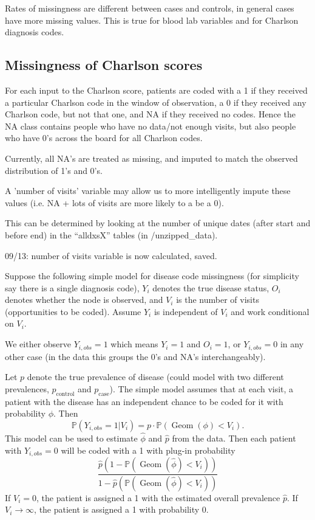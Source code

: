 \documentclass[12pt]{article}
\begin{document}
Rates of missingness are different between cases and controls, in general cases have more missing values. This is true for blood lab variables and for Charlson diagnosis codes.

\subsection*{Missingness of Charlson scores}

For each input to the Charlson score, patients are coded with a 1 if they received a particular Charlson code in the window of observation, a 0 if they received any Charlson code, but not that one, and NA if they received no codes. Hence the NA class contains people who have no data/not enough visits, but also people who have 0's across the board for all Charlson codes.

Currently, all NA's are treated as missing, and imputed to match the observed distribution of 1's and 0's.

A 'number of visits' variable may allow us to more intelligently impute these values (i.e. NA + lots of visits are more likely to a be a 0).

This can be determined by looking at the number of unique dates (after start and before end) in the ``alldxsX'' tables (in /unzipped\_data).

09/13: number of visits variable is now calculated, saved.

Suppose the following simple model for disease code missingness (for simplicity say there is a single diagnosis code), $Y_i$ denotes the true disease status, $O_i$ denotes whether the node is observed, and $V_i$ is the number of visits (opportunities to be coded). Assume $Y_i$ is independent of $V_i$ and work conditional on $V_i$.

We either observe $Y_{i,obs} = 1$ which means $Y_i=1$ and $O_i=1$, or $Y_{i,obs} = 0$ in any other case (in the data this groups the 0's and NA's interchangeably).

Let $p$ denote the true prevalence of disease (could model with two different prevalences, $p_{\mathrm{control}}$ and $p_{\mathrm{case}}$). The simple model assumes that at each visit, a patient with the disease has an independent chance to be coded for it with probability $\phi$. Then
\[
\mathbb{P}(Y_{i,obs}=1 | V_i) = p \cdot \mathbb{P}(\operatorname{Geom}(\phi) < V_i).
\]
This model can be used to estimate $\hat{\phi}$ and $\hat{p}$ from the data. Then each patient with $Y_{i,obs}=0$ will be coded with a 1 with plug-in probability
\[
\frac{\hat{p}\left(1 - \mathbb{P}(\operatorname{Geom}(\hat{\phi}) < V_i) \right)}{1-\hat{p} \left(\mathbb{P}(\operatorname{Geom}(\hat{\phi}) < V_i) \right)}
\]
If $V_i=0$, the patient is assigned a 1 with the estimated overall prevalence $\hat{p}$. If $V_i \rightarrow \infty$, the patient is assigned a 1 with probability 0.
\end{document}
